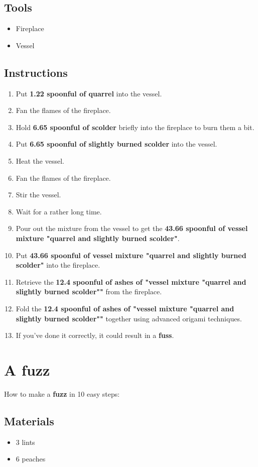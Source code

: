 \documentclass{article}
\begin{document}
\subsection{Tools}\begin{itemize}
\item 
Fireplace
\item 
Vessel
\end{itemize}
\subsection{Instructions}\begin{enumerate}
\item 
Put \textbf{1.22 spoonful of quarrel} into the vessel.
\item 
Fan the flames of the fireplace.
\item 
Hold \textbf{6.65 spoonful of scolder} briefly into the fireplace to burn them a bit.
\item 
Put \textbf{6.65 spoonful of slightly burned scolder} into the vessel.
\item 
Heat the vessel.
\item 
Fan the flames of the fireplace.
\item 
Stir the vessel.
\item 
Wait for a rather long time.
\item 
Pour out the mixture from the vessel to get the \textbf{43.66 spoonful of vessel mixture "quarrel and slightly burned scolder"}.
\item 
Put \textbf{43.66 spoonful of vessel mixture "quarrel and slightly burned scolder"} into the fireplace.
\item 
Retrieve the \textbf{12.4 spoonful of ashes of "vessel mixture "quarrel and slightly burned scolder""} from the fireplace.
\item 
Fold the \textbf{12.4 spoonful of ashes of "vessel mixture "quarrel and slightly burned scolder""} together using advanced origami techniques.
\item 
If you've done it correctly, it could result in a \textbf{fuss}.
\end{enumerate}
\newpage
\section{A fuzz}How to make a \textbf{fuzz} in 10 easy steps:

\subsection{Materials}\begin{itemize}
\item 
3 lints
\item 
6 peaches
\end{itemize}
\end{document}
